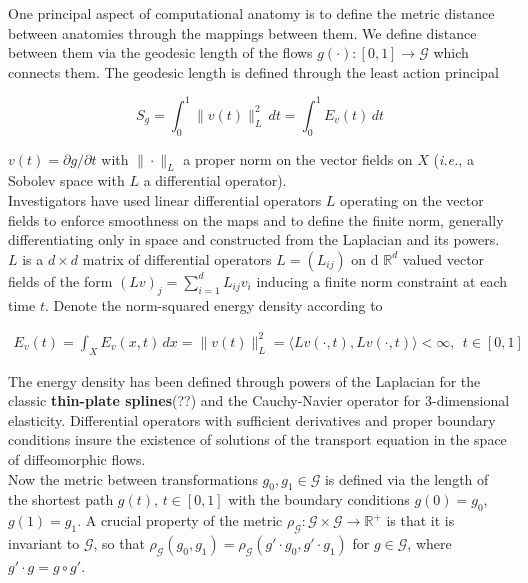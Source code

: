 \documentclass[preprint,review,8pt,times]{elsarticle}
\newcommand{\CA}{computational anatomy}
\begin{document}
One principal aspect of \CA{} is to define the metric distance between anatomies through the mappings between them. We define distance between them via the geodesic length of the flows $g(\cdot): [0, 1] \rightarrow \mathcal{G}$ which connects them. The geodesic length is defined through the least action principal 

$$
S_{g} = \int_{0}^{1} \|v(t)\|_{L}^{2} \,dt = \int_{0}^{1} E_{v}(t) \,dt
$$ 

$v(t) = \partial g/ \partial t$ with $\| \cdot \|_{L}$ a proper norm on the vector fields on $X$ ({\it i.e.}, a Sobolev space with $L$ a differential operator). \\

Investigators have used linear differential operators $L$ operating on the vector fields to enforce smoothness on the maps and to define the finite norm, generally differentiating only in space and constructed from the Laplacian and its powers. $L$ is a $d \times d$ matrix of differential operators $L = (L_{ij})$ on d $\mathbb{R}^{d}$ valued vector fields of the form $(Lv)_{j} = \sum_{i = 1}^{d} L_{ij}v_{i}$ inducing a finite norm constraint at each time $t$. Denote the norm-squared energy density according to 

\begin{eqnarray}
 E_{v}(t) = \int_{X}E_{v}(x,t) \, dx = \| v(t)\|_{L}^{2} = \langle Lv(\cdot, t), Lv(\cdot, t) \rangle < \infty, ~~t \in [0,1]
\label{EnergyDensity}
\end{eqnarray}

The energy density has been defined through powers of the Laplacian for the classic {\bf thin-plate splines}(??) and the Cauchy-Navier operator for 3-dimensional elasticity. Differential operators with sufficient derivatives and proper boundary conditions insure the existence of solutions of the transport equation in the space of diffeomorphic flows.\\

Now the metric between transformations $g_{0}, g_{1} \in \mathcal{G}$ is defined via the length of the shortest path $g(t)$, $t \in [0, 1]$ with the boundary conditions $g(0) = g_{0}$, $g(1) = g_{1}$. A crucial property of the metric $\rho_{\mathcal{G}}: \mathcal{G} \times \mathcal{G} \rightarrow \mathbb{R}^{+}$ is that it is invariant to $\mathcal{G}$, so that $\rho_{\mathcal{G}}(g_{0}, g_{1}) = \rho_{\mathcal{G}}(g' \cdot g_{0}, g' \cdot g_{1})$ for $g \in \mathcal{G}$, where $g' \cdot g = g \circ g'$.
\end{document}
